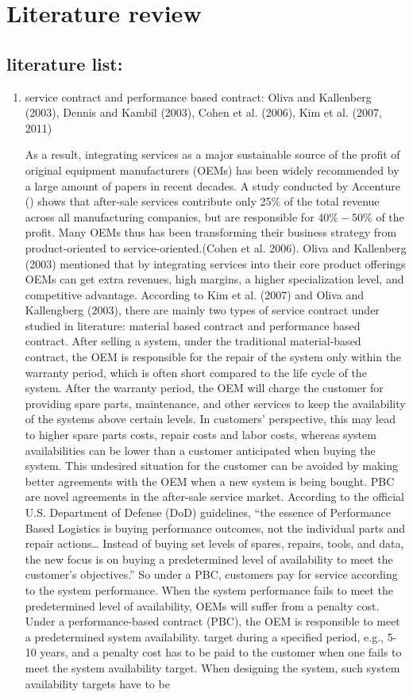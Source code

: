 \documentclass[preprint,12pt]{elsarticle}
\begin{document}
\section{Literature review}
\subsection {literature list:}
\begin{enumerate}

\item service contract and performance based contract: Oliva and Kallenberg (2003), Dennis and Kambil (2003), Cohen et al. (2006), Kim et al. (2007, 2011)

As a result, integrating services as a major sustainable source of the profit of original equipment manufacturers (OEMs) has been widely recommended by a large amount of papers in recent decades. A study conducted by Accenture (\citet{Dennis}) shows that after-sale services contribute only 25\% of the total revenue across all manufacturing companies, but are responsible for $40\%-50\%$ of the profit. Many OEMs thus has been transforming their business strategy from product-oriented to service-oriented.(Cohen et al. 2006). Oliva and Kallenberg (2003) mentioned that by integrating services into their core product offerings OEMs can get extra revenues, high margins, a higher specialization level, and competitive advantage. According to Kim et al. (2007) and Oliva and Kallengberg (2003), there are mainly two types of service contract under studied in literature: material based contract and performance based contract. After selling a system, under the traditional material-based contract, the OEM is responsible for the repair of the system only within the warranty period, which is often short compared to the life cycle of the system. After the warranty period, the OEM will charge the customer for providing spare parts, maintenance, and other services to keep the availability of the systems above certain levels. In customers' perspective, this may lead to higher spare parts costs, repair costs and labor costs, whereas system availabilities can be lower than a customer anticipated when buying the system. This undesired situation for the customer can be avoided by making better agreements with the OEM when a new system is being bought. PBC are novel agreements in the after-sale service market. According to the official U.S. Department of Defense (DoD) guidelines, “the essence of Performance Based Logistics is buying performance outcomes, not the individual parts and repair actions… Instead of buying set levels of spares, repairs, tools, and data, the new focus is on buying a predetermined level of availability to meet the customer’s objectives.” So under a PBC, customers pay for service according to the system performance. When the system performance fails to meet the predetermined level of availability, OEMs will suffer from a penalty cost.  Under a performance-based contract (PBC), the OEM is responsible to meet a predetermined system availability. target during a specified period, e.g., 5-10 years, and a penalty cost has to be paid to the customer when one fails to meet the system availability target. When designing the system, such system availability targets have to be 
\end{enumerate}
\end{document}
